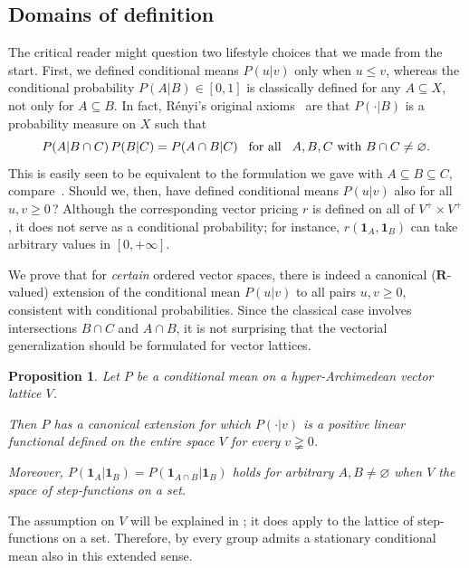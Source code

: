 \documentclass[11pt]{amsart}
\numberwithin{equation}{section}
\newtheorem{iprop}[ithm]{Proposition}
\theoremstyle{definition}
\theoremstyle{definition}
\newcommand*{\RR}{\mathbf{R}}
\newcommand*{\se}{\subseteq}
\newcommand*{\one}{\boldsymbol{1}}
\begin{document}
\subsection{Domains of definition}%
The critical reader might question two lifestyle choices that we made from the start. First, we defined conditional means $P(u|v)$ only when $u\leq v$, whereas the conditional probability $P(A|B)\in[0, 1]$ is classically defined for any $A\se X$, not only for $A\se B$. In fact, R{\'e}nyi's original axioms~\cite{Renyi55} are that $P(\cdot|B)$ is a probability measure on $X$ such that
\begin{equation*}
P(A|B \cap C) \, P(B|C) = P(A\cap B |C) \kern3mm\text{for all} \kern3mm A, B, C \text{ with } B\cap C\neq \varnothing.
\end{equation*}
This is easily seen to be equivalent to the formulation we gave with $A\se B\se  C$, compare~\cite[\S2.1]{Csaszar55}. Should we, then, have defined conditional means $P(u|v)$ also for all $u,v\geq 0$\,? Although the corresponding vector pricing $r$ is defined on all of $V^+\times V^+$, it does not serve as a conditional probability; for instance, $r(\one_A, \one_B)$ can take arbitrary values in $[0, +\infty]$.

\smallskip
We prove that for \emph{certain} ordered vector spaces, there is indeed a canonical ($\RR$-valued) extension of the conditional mean $P(u|v)$ to all pairs $u,v\geq 0$, consistent with conditional probabilities. Since the classical case involves intersections $B \cap C$ and $A\cap B$, it is not surprising that the vectorial generalization should be formulated for vector lattices.

\begin{iprop}\label{iprop:hyper-Arch}
Let $P$ be a conditional mean on a hyper-Archimedean vector lattice $V$.

Then $P$ has a canonical extension for which $P(\cdot | v)$ is a positive linear functional defined on the entire space $V$ for every $v\gneqq 0$.

Moreover, $P(\one_A|\one_B)=  P(\one_{A\cap B}|\one_B)$ holds for arbitrary $A,B \neq \varnothing$ when $V$ the space of step-functions on a set.
\end{iprop}

The assumption on $V$ will be explained in ; it does apply to the lattice of step-functions on a set. Therefore, by  every group admits a stationary conditional mean also in this extended sense.
\end{document}
